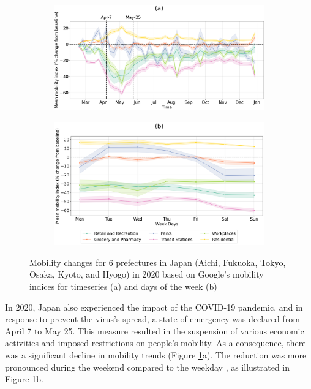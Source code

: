 \begin{figure}[tbh!]
    \centering
    \begin{subfigure}{\textwidth}
      \centering
      \includegraphics[width=\textwidth]{figs/chap4/fig1a_mobi_doy.png}
    \end{subfigure}

    \begin{subfigure}{\textwidth}
      \centering
      \includegraphics[width=\textwidth]{figs/chap4/fig1b_mobi_dow.png}
    \end{subfigure}
    \caption[Mobility changes for 6 prefectures in Japan]{Mobility changes for 6 prefectures in Japan (Aichi, Fukuoka, Tokyo, Osaka, Kyoto, and Hyogo) in 2020 based on Google’s mobility indices for timeseries (a) and days of the week (b)}
    \label{fig:chap4_fig1}
\end{figure}

In 2020, Japan also experienced the impact of the COVID-19 pandemic, and in response to prevent the virus's spread, a state of emergency was declared from April 7 to May 25. This measure resulted in the suspension of various economic activities and imposed restrictions on people's mobility. As a consequence, there was a significant decline in mobility trends (Figure \ref{fig:chap4_fig1}a). The reduction was more pronounced during the weekend compared to the weekday \citep{damiani2022peculiar}, as illustrated in Figure \ref{fig:chap4_fig1}b. \par

